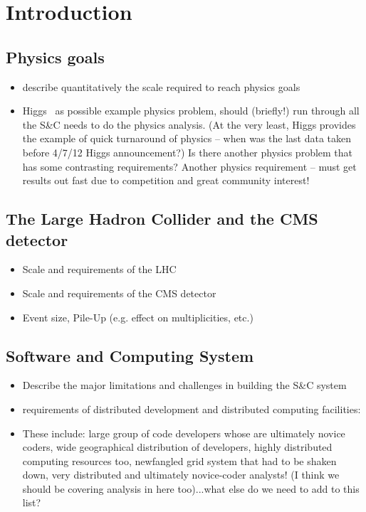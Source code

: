 \section{Introduction}

\subsection {Physics goals} 

\begin{itemize}
\item describe quantitatively the scale required to reach physics goals
\item Higgs~\cite{CMSHIGGS} as possible example physics problem, should (briefly!) run through all the S\&C needs to do the physics analysis.  (At the very least, Higgs provides the example of quick turnaround of physics -- when was the last data taken before 4/7/12 Higgs announcement?)  Is there another physics problem that has some contrasting requirements?  Another physics requirement -- must get results out fast due to competition and great community interest!
\end{itemize}

\subsection{The Large Hadron Collider and the CMS detector}

\begin{itemize}
\item Scale and requirements of the LHC
\item Scale and requirements of the CMS detector
\item Event size, Pile-Up (e.g. effect on multiplicities, etc.)
\end{itemize}

\subsection{Software and Computing System} 

\begin{itemize}
\item Describe the major limitations and challenges in building the S\&C system
\item requirements of distributed development and distributed computing facilities:
\item These include: large group of code developers whose are ultimately novice coders, wide geographical distribution of developers, highly distributed computing resources too, newfangled grid system that had to be shaken down, very distributed and ultimately novice-coder analysts! (I think we should be covering analysis in here too)...what else do we need to add to this list?
\end{itemize}

